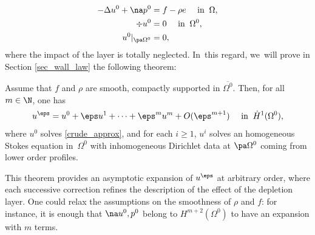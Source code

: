 \begin{equation} \label{crude_approx}
\begin{aligned}
-\Delta u^0 + \na p^0 &= f - \rho e \quad \text{ in } \: \Omega, \\
\div u^0 & = 0 \quad \text{ in } \: \Omega^0, \\
u^0 \vert_{\pa \Omega^0} & = 0,
\end{aligned}
\end{equation}
where the impact of the layer is totally neglected. In~this regard, we~will prove in Section \ref{sec_wall_law} the following theorem:
\begin{thm} \label{thm2}
Assume that $f$ and $\rho$ are smooth, compactly supported in $\overline{\Omega^0}$. Then, for all $m \in \N$, one has
\[
u^\eps = u^0 + \eps u^1 + \dots + \eps^m u^m + O(\eps^{m+1}) \quad \text{ in } \: \dot{H}^1(\Omega^0),
\]
where $u^0$ solves \eqref{crude_approx}, and for each $i \ge 1$, $u^i$ solves an homogeneous Stokes equation in~$\Omega^0$ with inhomogeneous Dirichlet data at $\pa \Omega^0$ coming from lower order profiles.
\end{thm}
This theorem provides an asymptotic expansion of $u^\eps$ at arbitrary order, where each successive correction refines the description of the effect of the depletion layer. One could relax the assumptions on the smoothness of $\rho$ and $f$: for instance, it is enough that $\na u^0,p^0$ belong to $H^{m+2}(\Omega^0)$ to have an expansion with $m$ terms.
